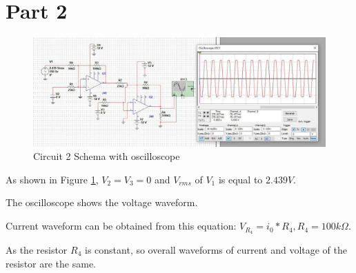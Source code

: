 \documentclass[a4paper,twoside]{report}
\begin{document}
    \section*{Part 2}
    {
        \begin{figure}[!h]
            \includegraphics[width=\linewidth]{part2.jpg}
            \caption{Circuit 2 Schema with oscilloscope}
            \label{fig:part2}
        \end{figure}

        As shown in Figure \ref{fig:part2}, $V_2 = V_3 = 0$ and $V_{rms}$ of $V_1$ is equal to $2.439 V$.

        The oscilloscope shows the voltage waveform.

        Current waveform can be obtained from this equation: $V_{R_4} = i_0 * R_4, R_4 = 100k\Omega$.

        As the resistor $R_4$ is constant, so overall waveforms of current and voltage of the resistor are the same.
  }
\end{document}

